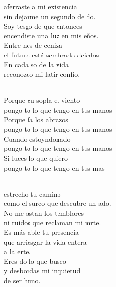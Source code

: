 \documentclass[12pt]{article}
\begin{document}
\begin{multicols*}{2}
\begin{cancion}%
	 aferraste a mi existencia  \\
	sin dejarme un segundo de do.  \\
	Soy tesgo de que entonces  \\
	encendiste una luz en mis eños.  \\
	Entre nes de ceniza \\
	el futuro está sembrado deiedos.  \\
	En cada so de la vida \\
	reconozco mi latir confio.\\\jump\\
	\begin{chorus}%
	Porque cu sopla el viento  \\
	pongo to lo que tengo en tus manos\\
	Porque fa los abrazos  \\
	pongo to lo que tengo en tus manos\\
	Cuando estoyndonado  \\
	pongo to lo que tengo en tus manos\\
	Si luces lo que quiero  \\
	pongo to lo que tengo en tus mas\\
	\end{chorus}%
	\jump\\
	 estrecho tu camino \\
	como el surco que descubre un ado. \\
	No me astan los temblores \\
	ni ruidos que reclaman mi mrte.\\
	Es más able tu presencia \\
que arriesgar la vida entera\\
	a la erte.\\
	Eres do lo que busco \\
y desbordas mi inquietud\\
	de ser huno.\\
\end{cancion}%


\end{multicols*}
\end{document}
